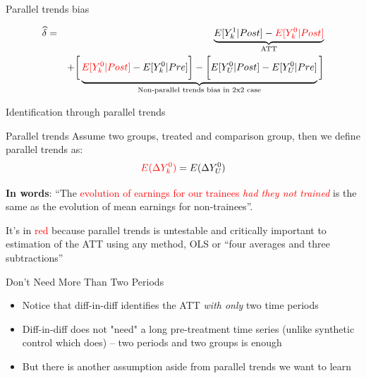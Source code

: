 \documentclass{beamer}
\begin{document}
\begin{frame}{Parallel trends bias}

\begin{eqnarray*}
\widehat{\delta} &=& \underbrace{E[Y^1_k | Post] - \textcolor{red}{E[Y^0_k | Post]}}_{\mathclap{\text{ATT}}} \\
&& + \bigg [  \underbrace{\textcolor{red}{E[Y^0_k | Post]} - E[Y^0_k | Pre] \bigg ] - \bigg [ E[Y^0_U | Post] - E[Y_U^0 | Pre] }_{\mathclap{\text{Non-parallel trends bias in 2x2 case}}} \bigg ]
\end{eqnarray*}


\end{frame}

\begin{frame}{Identification through parallel trends}
	

	\begin{block}{Parallel trends}
	Assume two groups, treated and comparison group, then we define parallel trends as:	 $$\textcolor{red}{E(}\textcolor{red}{\Delta Y^0_k)} = E(\Delta Y^0_U)$$
	\end{block}

\textbf{In words}: ``The \textcolor{red}{evolution of earnings for our trainees \emph{had they not trained}} is the same as the evolution of mean earnings for non-trainees''.  

\bigskip

It's in \textcolor{red}{red} because parallel trends is untestable and critically important to estimation of the ATT using any method, OLS or ``four averages and three subtractions''

\end{frame}

\begin{frame}{Don't Need More Than Two Periods}

\begin{itemize}

\item Notice that diff-in-diff identifies the ATT \emph{with only} two time periods
\item Diff-in-diff does not "need" a long pre-treatment time series (unlike synthetic control which does) -- two periods and two groups is enough
\item But there is another assumption aside from parallel trends we want to learn

\end{itemize}

\end{frame}
\end{document}
